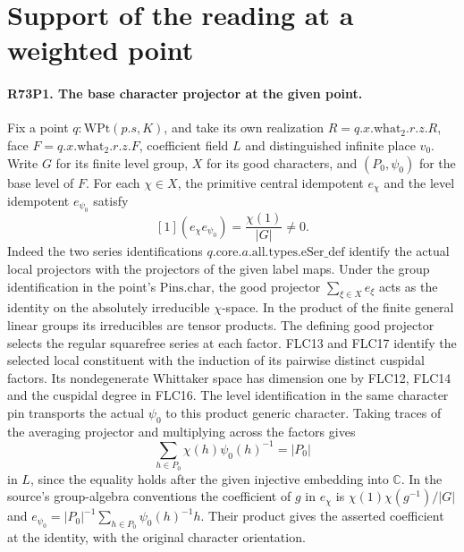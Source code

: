 \section{Support of the reading at a weighted point}

\paragraph{R73P1. The base character projector at the given point.}
\label{claim:R73P1}
Fix a point $q:\mathrm{WPt}(p.s,K)$, and take its own realization
$R=q.x.\mathrm{what}_2.r.z.R$, face $F=q.x.\mathrm{what}_2.r.z.F$,
coefficient field $L$ and distinguished infinite place $v_0$.
Write $G$ for its finite level group, $X$ for its good characters,
and $(P_0,\psi_0)$ for the base level of $F$.
For each $\chi\in X$, the primitive central idempotent $e_\chi$
and the level idempotent $e_{\psi_0}$ satisfy
\[
 [1](e_\chi e_{\psi_0})=\frac{\chi(1)}{|G|}\ne 0 .
\]
Indeed the two series identifications $q.\mathrm{core}.a.\mathrm{all}.\mathrm{types}.\mathrm{eSer\_def}$
identify the actual local projectors with the projectors of the given label
maps. Under the group identification in the point's $\mathrm{Pins}.\mathrm{char}$,
the good projector $\sum_{\xi\in X}e_\xi$ acts as the identity on the
absolutely irreducible $\chi$-space. In the product of the finite general
linear groups its irreducibles are tensor products. The defining good
projector selects the regular squarefree series at each factor. FLC13
and FLC17 identify the selected local constituent with the induction
of its pairwise distinct cuspidal factors. Its nondegenerate Whittaker
space has dimension one by FLC12, FLC14 and the cuspidal degree in FLC16.
The level identification in the same character pin transports the actual
$\psi_0$ to this product generic character. Taking traces of the averaging
projector and multiplying across the factors gives
\[
  \sum_{h\in P_0}\chi(h)\psi_0(h)^{-1}=|P_0|
\]
in $L$, since the equality holds after the given injective embedding
into $\mathbb C$. In the source's group-algebra conventions the
coefficient of $g$ in $e_\chi$ is $\chi(1)\chi(g^{-1})/|G|$
and $e_{\psi_0}=|P_0|^{-1}\sum_{h\in P_0}\psi_0(h)^{-1}h$.
Their product gives the asserted coefficient at the identity, with
the original character orientation.

